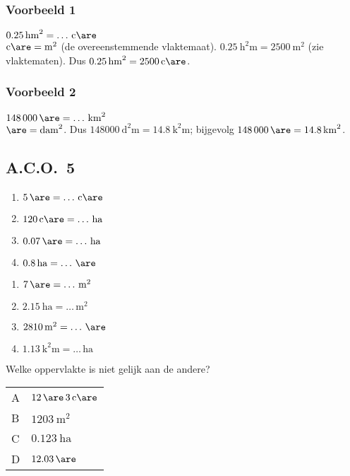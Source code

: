 \documentclass[a4paper,12pt]{article}
\begin{document}
\subsubsection*{Voorbeeld 1}
\(\SI{0.25}{\square\hecto\metre}=\ldots\,\si{\centi\are}\)\\
\(\si{\centi\are} = \si{\square\metre}\) (de overeenstemmende vlaktemaat). \(\SI{0.25}{\square\hecto\metre}=\SI{2500}{\square\metre}\) (zie vlaktematen). Dus \(\SI{0.25}{\square\hecto\metre}=\SI{2500}{\centi\are}\).

\subsubsection*{Voorbeeld 2}
\(\SI{148000}{\are}=\ldots\,\si{\square\kilo\metre}\)\\
\(\si{\are}=\si{\square\deca\metre}\). Dus \(\SI{148000}{\square\deca\metre}=\SI{14.8}{\square\kilo\metre}\); bijgevolg \(\SI{148000}{\are}=\SI{14.8}{\square\kilo\metre}\).

\subsection*{A.C.O.~5}
\begin{multicols}{2}
\begin{enumerate}
  \item \(\SI{5}{\are}=\ldots\,\si{\centi\are}\)
  \item \(\SI{120}{\centi\are}=\ldots\,\si{\hectare}\)
  \item \(\SI{0.07}{\are}=\ldots\,\si{\hectare}\)
  \item \(\SI{0.8}{\hectare}=\ldots\,\si{\are}\)
\end{enumerate}
\columnbreak
\begin{enumerate}[start=5]
  \item \(\SI{7}{\are}=\ldots\,\si{\square\metre}\)
  \item \(\SI{2.15}{\hectare}=\ldots\,\si{\square\metre}\)
  \item \(\SI{2810}{\square\metre}=\ldots\,\si{\are}\)
  \item \(\SI{1.13}{\square\kilo\metre}=\ldots\,\si{\hectare}\)
\end{enumerate}
\end{multicols}

Welke oppervlakte is niet gelijk aan de andere?\\
\begin{tabular}{@{}ll@{}}
A & \(\SI{12}{\are}\,\SI{3}{\centi\are}\) \\
B & \(\SI{1203}{\square\metre}\) \\
C & \(\SI{0.123}{\hectare}\) \\
D & \(\SI{12.03}{\are}\) \\
\end{tabular}
\end{document}
